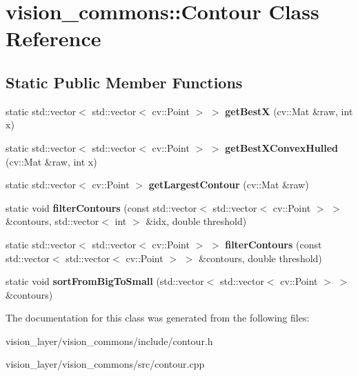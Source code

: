 \hypertarget{classvision__commons_1_1Contour}{}\section{vision\+\_\+commons\+:\+:Contour Class Reference}
\label{classvision__commons_1_1Contour}
\subsection*{Static Public Member Functions}
\begin{DoxyCompactItemize}
\item 
\mbox{\label{classvision__commons_1_1Contour_afbf0efa9f03f40eb38f3b889262e8284}} 
static std\+::vector$<$ std\+::vector$<$ cv\+::\+Point $>$ $>$ {\bfseries get\+BestX} (cv\+::\+Mat \&raw, int x)
\item 
\mbox{\label{classvision__commons_1_1Contour_a194702cb0e126c5d006b3a63b755fdc8}} 
static std\+::vector$<$ std\+::vector$<$ cv\+::\+Point $>$ $>$ {\bfseries get\+Best\+X\+Convex\+Hulled} (cv\+::\+Mat \&raw, int x)
\item 
\mbox{\label{classvision__commons_1_1Contour_a58ce1db921cc4e834038de296d0fad6a}} 
static std\+::vector$<$ cv\+::\+Point $>$ {\bfseries get\+Largest\+Contour} (cv\+::\+Mat \&raw)
\item 
\mbox{\label{classvision__commons_1_1Contour_a71b6dd8585b3a0113f121b79aea43cfa}} 
static void {\bfseries filter\+Contours} (const std\+::vector$<$ std\+::vector$<$ cv\+::\+Point $>$ $>$ \&contours, std\+::vector$<$ int $>$ \&idx, double threshold)
\item 
\mbox{\label{classvision__commons_1_1Contour_a4925cbaeffe176f452546194009079f0}} 
static std\+::vector$<$ std\+::vector$<$ cv\+::\+Point $>$ $>$ {\bfseries filter\+Contours} (const std\+::vector$<$ std\+::vector$<$ cv\+::\+Point $>$ $>$ \&contours, double threshold)
\item 
\mbox{\label{classvision__commons_1_1Contour_a83cc11df062249a286aa0390ed3c6b7c}} 
static void {\bfseries sort\+From\+Big\+To\+Small} (std\+::vector$<$ std\+::vector$<$ cv\+::\+Point $>$ $>$ \&contours)
\end{DoxyCompactItemize}


The documentation for this class was generated from the following files\+:\begin{DoxyCompactItemize}
\item 
vision\+\_\+layer/vision\+\_\+commons/include/contour.\+h\item 
vision\+\_\+layer/vision\+\_\+commons/src/contour.\+cpp\end{DoxyCompactItemize}

